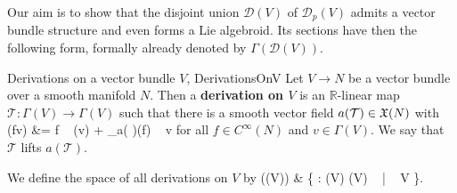 \begin{remark}
%
%
\end{remark}

Our aim is to show that the disjoint union $\mathcal{D}(V)$ of $\mathcal{D}_p(V)$ admits a vector bundle structure and even forms a Lie algebroid. Its sections have then the following form, formally already denoted by $\Gamma(\mathcal{D}(V))$.

\begin{definitions}{Derivations on a vector bundle $V$, \newline \cite[Example 3.3.4; page 102f.]{mackenzieGeneralTheory}}{DerivationsOnV}
Let $V \to N$ be a vector bundle over a smooth manifold $N$. Then a \textbf{derivation on $V$} is an $\mathbb{R}$-linear map $\mathcal{T}: \Gamma(V) \to \Gamma(V)$ such that there is a smooth vector field $a\mleft( \mathcal{T} \mright) \in \mathfrak{X}(N)$ with
\ba\label{eqDerivationsLiftASuperDuperVectorField}
(fv)
&=
f ~ (v)
	+ _{a\mleft(  \mright)}(f) ~ v
\ea
for all $f \in C^\infty(N)$ and $v \in \Gamma(V)$. We say that $\mathcal{T}$ lifts $a(\mathcal{T})$.

We define the space of all derivations on $V$ by
\ba
\Gamma((V))
&\coloneqq
\left\{
: \Gamma(V) \to \Gamma(V) ~ \middle| ~
  V
\right\}.
\ea
\end{definitions}

